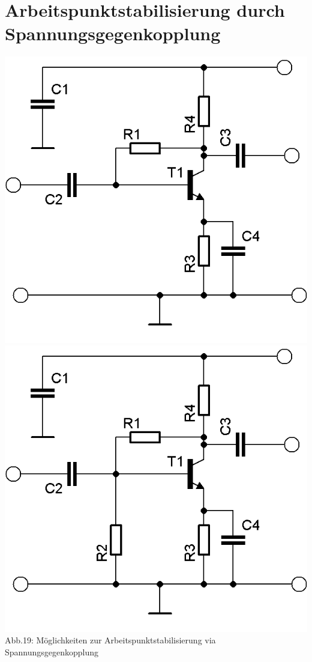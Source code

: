 \section*{Arbeitspunktstabilisierung durch Spannungsgegenkopplung}
\begin{frame}
	\begin{center}
		\includegraphics[scale=0.8]{a06/Transistor-Verstaerker-APstab2a.png}
		\vspace{3mm}
		\includegraphics[scale=0.8]{a06/Transistor-Verstaerker-APstab2b.png}\\
		Abb.19: Möglichkeiten zur Arbeitspunktstabilisierung via Spannungsgegenkopplung 
	\end{center}
\end{frame}

